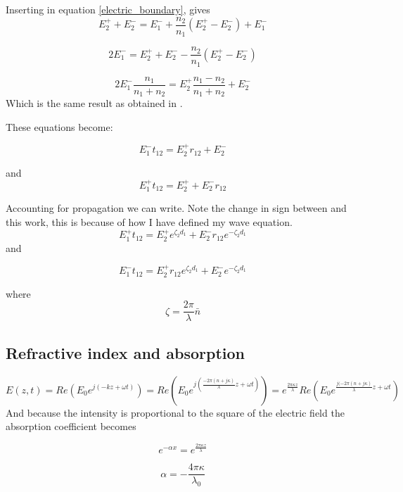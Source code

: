 Inserting in equation \ref{electric_boundary}, gives 
\begin{equation}
E_{2}^{+}+E_{2}^{-}=E_{1}^{-} +\frac{n_2}{n_1}(E_{2}^{+}-E_{2}^{-})+E_{1}^{-}
\end{equation}

\begin{equation}
2E_{1}^{-}=E_{2}^{+}+E_{2}^{-}- \frac{n_2}{n_1}(E_{2}^{+}-E_{2}^{-})
\end{equation}

\begin{equation}
2E_{1}^{-}\frac{n_1}{n_1+n_2}=E_{2}^{+}\frac{n_1-n_2}{n_1+n_2}+E_{2}^{-}
\end{equation}
Which is the same result as obtained in \cite{10.1063/1.1534621}.

These equations become:

\begin{equation}
E_{1}^{-}t_{12}=E_{2}^{+}r_{12}+E_{2}^{-}
\end{equation}

and
\begin{equation}
E_{1}^{+}t_{12}=E_{2}^{+}+E_{2}^{-}r_{12}
\end{equation}

Accounting for propagation we can write.  Note the change in sign between \cite{10.1063/1.1534621} and this work, this is because of how I have defined my wave equation. 
\begin{equation}
E_{1}^{+}t_{12}=E_{2}^{+}e^{\zeta_2 d_1}+E_{2}^{-}r_{12}e^{-\zeta_2 d_1}
\end{equation}
and

\begin{equation}
E_{1}^{-}t_{12}=E_{2}^{+}r_{12}e^{\zeta_2 d_1}+E_{2}^{-}e^{-\zeta_2 d_1}
\end{equation}

where
\begin{equation}
\zeta=\frac{2\pi}{\lambda} \bar{n}
\end{equation}



\subsection{Refractive index and absorption}
\begin{equation}
E(z,t)=Re(E_0 e^{j(-kz+\omega t)})= Re(E_0 e^{j(\frac{-2 \pi (n+j\kappa)}{\lambda}z + \omega t)})=e^{\frac{2\pi\kappa z}{\lambda}}Re(E_0 e^{\frac{j(-2 \pi (n+j\kappa)}{\lambda}z +\omega t})
\end{equation}
And because the intensity is proportional to the square of the electric field the absorption coefficient becomes

\begin{equation}
e^{-\alpha x}=e^{\frac{2\pi\kappa z}{\lambda}}
\end{equation}

\begin{equation}
\alpha=-\frac{4\pi\kappa}{\lambda_0}
\end{equation}


\newpage
\vfill
